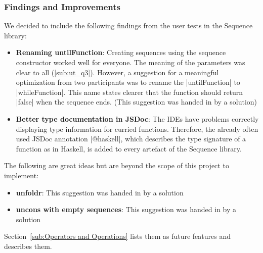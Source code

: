 \subsubsection{Findings and Improvements} %
\label{subsub:seq_findings_and_improvements}
We decided to include the following findings from the user tests in the Sequence
library:
\begin{itemize}
  \item \textbf{Renaming untilFunction}: Creating sequences using the sequence
    constructor worked well for everyone. The meaning of the parameters was
    clear to all (\ref{sub:ut_q3}). However, a suggestion for a meaningful
    optimization from two participants was to rename the |untilFunction| to
    |whileFunction|. This name states clearer that the function should return
    |false| when the sequence ends. (This suggestion was handed in by a
    solution)
  \item \textbf{Better type documentation in JSDoc}: The IDEs have problems
    correctly displaying type information for curried functions.
    Therefore, the already often used JSDoc annotation |@haskell|, which
    describes the type signature of a function as in Haskell, is added
    to every artefact of the Sequence library.
\end{itemize}
The following are great ideas but are beyond the scope of this project to
implement:
\begin{itemize}
  \item \textbf{unfoldr}: This suggestion was handed in by a solution
  \item \textbf{uncons with empty sequences}: This suggestion was handed in by a solution
\end{itemize}
Section~\ref{sub:Operators and Operations} lists them as future features and
describes them.

